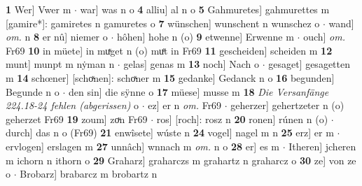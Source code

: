 \documentclass[8pt,a4paper,notitlepage]{article}
\begin{document}
\begin{table}[ht]
\begin{minipage}[t]{0.5\linewidth}
\textbf{1} Wer] Vwer m  $\cdot$ war] was n o \textbf{4} alliu] al n o \textbf{5} Gahmuretes] gahmurettes m [gamire*]: gamiretes n gamuretes o \textbf{7} wünschen] wunschent n wunschez o  $\cdot$ wand] \textit{om.} n \textbf{8} er nû] niemer o  $\cdot$ hôhen] hohe n (o) \textbf{9} etwenne] Erwenne m  $\cdot$ ouch] \textit{om.} Fr69 \textbf{10} in müete] in muͯget n (o) muͤt in Fr69 \textbf{11} gescheiden] scheiden m \textbf{12} munt] munpt m nẏman n  $\cdot$ gelas] genas m \textbf{13} noch] Nach o  $\cdot$ gesaget] gesagetten m \textbf{14} schœner] [schoͯnen]: schoͯner m \textbf{15} gedanke] Gedanck n o \textbf{16} begunden] Begunde n o  $\cdot$ den sin] die sÿnne o \textbf{17} müese] musse m \textbf{18} \textit{Die Versanfänge 224.18-24 fehlen (abgerissen)} o   $\cdot$ ez] er n \textit{om.} Fr69  $\cdot$ geherzer] gehertzeter n (o) geherzet Fr69 \textbf{19} zoum] zoͮn Fr69  $\cdot$ ros] [roch]: rosz n \textbf{20} ronen] rúnen n (o)  $\cdot$ durch] das n o (Fr69) \textbf{21} enwîsete] wúste n \textbf{24} vogel] nagel m n \textbf{25} erz] er m  $\cdot$ ervlogen] erslagen m \textbf{27} unnâch] wnnach m \textit{om.} n o \textbf{28} er] es m  $\cdot$ Itheren] jcheren m ichorn n ithorn o \textbf{29} Graharz] graharczs m grahartz n graharcz o \textbf{30} ze] von ze o  $\cdot$ Brobarz] brabarcz m brobartz n \newline
\end{minipage}
\end{table}
\newpage
\end{document}
